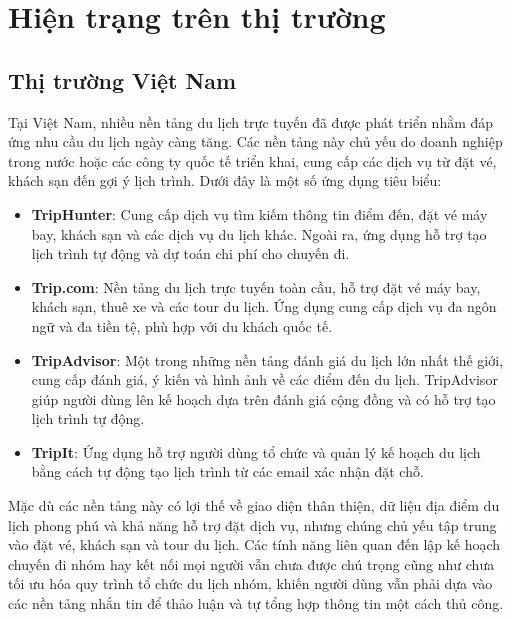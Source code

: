 \section{Hiện trạng trên thị trường}
\subsection{Thị trường Việt Nam}

Tại Việt Nam, nhiều nền tảng du lịch trực tuyến đã được phát triển nhằm đáp ứng nhu cầu du lịch ngày càng tăng. Các nền tảng này chủ yếu do doanh nghiệp trong nước hoặc các công ty quốc tế triển khai, cung cấp các dịch vụ từ đặt vé, khách sạn đến gợi ý lịch trình. Dưới đây là một số ứng dụng tiêu biểu:

\begin{itemize}
    \item \textbf{TripHunter}\cite{triphunter}: Cung cấp dịch vụ tìm kiếm thông tin điểm đến, đặt vé máy bay, khách sạn và các dịch vụ du lịch khác. Ngoài ra, ứng dụng hỗ trợ tạo lịch trình tự động và dự toán chi phí cho chuyến đi.

    \item \textbf{Trip.com}\cite{tripcom}: Nền tảng du lịch trực tuyến toàn cầu, hỗ trợ đặt vé máy bay, khách sạn, thuê xe và các tour du lịch. Ứng dụng cung cấp dịch vụ đa ngôn ngữ và đa tiền tệ, phù hợp với du khách quốc tế.

    \item \textbf{TripAdvisor}\cite{tripadvisor}: Một trong những nền tảng đánh giá du lịch lớn nhất thế giới, cung cấp đánh giá, ý kiến và hình ảnh về các điểm đến du lịch. TripAdvisor giúp người dùng lên kế hoạch dựa trên đánh giá cộng đồng và có hỗ trợ tạo lịch trình tự động.

    \item \textbf{TripIt}\cite{tripit}: Ứng dụng hỗ trợ người dùng tổ chức và quản lý kế hoạch du lịch bằng cách tự động tạo lịch trình từ các email xác nhận đặt chỗ.

\end{itemize}

Mặc dù các nền tảng này có lợi thế về giao diện thân thiện, dữ liệu địa điểm du lịch phong phú và khả năng hỗ trợ đặt dịch vụ, nhưng chúng chủ yếu tập trung vào đặt vé, khách sạn và tour du lịch. Các tính năng liên quan đến lập kế hoạch chuyến đi nhóm hay kết nối mọi người vẫn chưa được chú trọng cũng như chưa tối ưu hóa quy trình tổ chức du lịch nhóm, khiến người dùng vẫn phải dựa vào các nền tảng nhắn tin để thảo luận và tự tổng hợp thông tin một cách thủ công.


